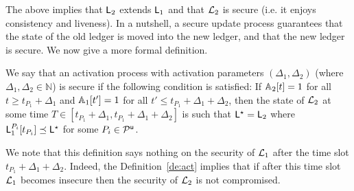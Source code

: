 



The above implies that $\mathsf{L}_2$  extends $\mathsf{L}_1$ and that $\mathcal{L}_2$ is secure (i.e. it enjoys consistency and liveness).
In a nutshell, a secure update process guarantees that the state of the old ledger is moved into the new ledger, and that the new ledger is secure.
We now give a more formal definition.

\begin{definition}\label{de:act}
 We say that an activation process with activation parameters $(\Delta_1,\Delta_2)$ (where $\Delta_1,\Delta_2\in\mathbb{N}$) is secure if the following condition is satisfied:
If $\mathbb{A}_2[t]=1$ for all $t\geq t_{P_1}+\Delta_1$ %
and $\mathbb{A}_1[t']=1$ for all $t' \leq t_{P_1}+\Delta_1+\Delta_2$, then the state of $\mathcal{L}_2$ at some time $T\in [t_{P_1}+\Delta_1, t_{P_1}+\Delta_1+\Delta_2]$ is such that $\mathsf{L}^\star=\mathsf{L}_2$ where $  \mathsf{L}_1^{P_i}[t_{P_i}] \preceq \mathsf{L}^\star$ for some $P_i\in\mathcal{P}^\mathsf{u}$.  
\end{definition}

We note that this definition says nothing on the security of $\mathcal{L}_1$ after the time slot $t_{P_1}+\Delta_1+\Delta_2$. Indeed, the Definition~\ref{de:act} implies that if
after this time slot $\mathcal{L}_1$ becomes insecure then the security of $\mathcal{L}_2$ is not compromised.



